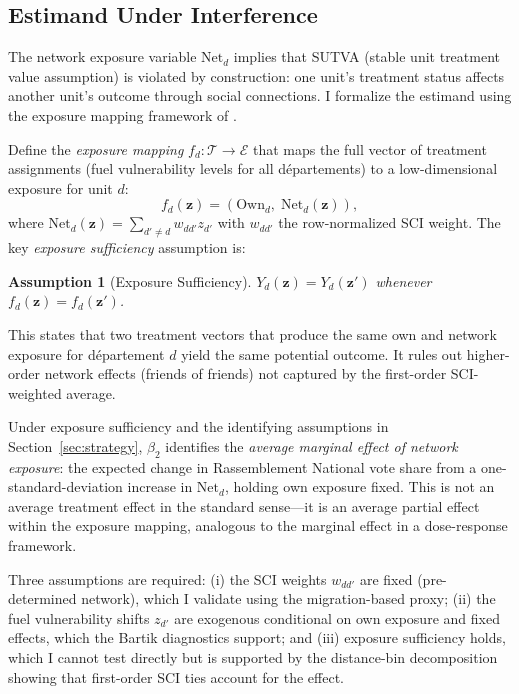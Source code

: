 \documentclass[12pt]{article}
\newtheorem{assumption}{Assumption}
\newcommand{\rn}{Rassemblement National}
\newcommand{\dept}{d\'{e}partement}
\newcommand{\depts}{d\'{e}partements}
\begin{document}
\subsection{Estimand Under Interference}
\label{sec:estimand}

The network exposure variable $\text{Net}_d$ implies that SUTVA (stable unit treatment value assumption) is violated by construction: one unit's treatment status affects another unit's outcome through social connections. I formalize the estimand using the exposure mapping framework of \citet{aronow2017estimating}.

Define the \emph{exposure mapping} $f_d: \mathcal{T} \to \mathcal{E}$ that maps the full vector of treatment assignments (fuel vulnerability levels for all \depts{}) to a low-dimensional exposure for unit $d$:
\begin{equation}
f_d(\mathbf{z}) = \left(\text{Own}_d, \; \text{Net}_d(\mathbf{z})\right),
\label{eq:exposure_mapping}
\end{equation}
where $\text{Net}_d(\mathbf{z}) = \sum_{d' \neq d} w_{dd'} z_{d'}$ with $w_{dd'}$ the row-normalized SCI weight. The key \emph{exposure sufficiency} assumption is:
\begin{assumption}[Exposure Sufficiency]
$Y_d(\mathbf{z}) = Y_d(\mathbf{z}')$ whenever $f_d(\mathbf{z}) = f_d(\mathbf{z}')$.
\end{assumption}
This states that two treatment vectors that produce the same own and network exposure for \dept{} $d$ yield the same potential outcome. It rules out higher-order network effects (friends of friends) not captured by the first-order SCI-weighted average.

Under exposure sufficiency and the identifying assumptions in Section~\ref{sec:strategy}, $\beta_2$ identifies the \emph{average marginal effect of network exposure}: the expected change in \rn{} vote share from a one-standard-deviation increase in $\text{Net}_d$, holding own exposure fixed. This is not an average treatment effect in the standard sense---it is an average partial effect within the exposure mapping, analogous to the marginal effect in a dose-response framework.

Three assumptions are required: (i) the SCI weights $w_{dd'}$ are fixed (pre-determined network), which I validate using the migration-based proxy; (ii) the fuel vulnerability shifts $z_{d'}$ are exogenous conditional on own exposure and fixed effects, which the Bartik diagnostics support; and (iii) exposure sufficiency holds, which I cannot test directly but is supported by the distance-bin decomposition showing that first-order SCI ties account for the effect.
\end{document}
